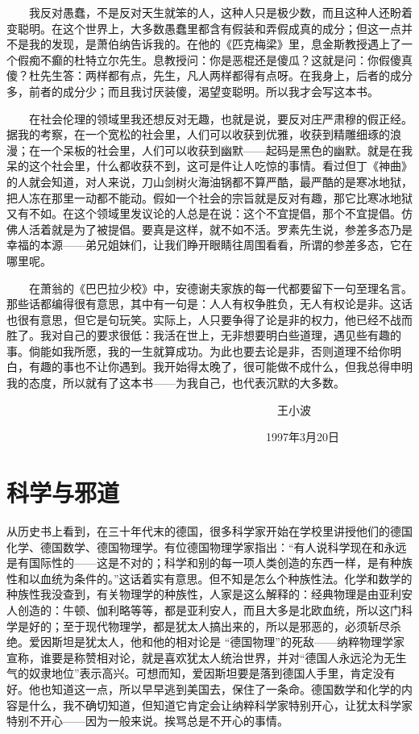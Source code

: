 　　我反对愚蠢，不是反对天生就笨的人，这种人只是极少数，而且这种人还盼着变聪明。在这个世界上，大多数愚蠢里都含有假装和弄假成真的成分；但这一点并不是我的发现，是萧伯纳告诉我的。在他的《匹克梅梁》里，息金斯教授遇上了一个假痴不癫的杜特立尔先生。息教授问：你是恶棍还是傻瓜？这就是问：你假傻真傻？杜先生答：两样都有点，先生，凡人两样都得有点呀。在我身上，后者的成分多，前者的成分少；而且我讨厌装傻，渴望变聪明。所以我才会写这本书。 

　　在社会伦理的领域里我还想反对无趣，也就是说，要反对庄严肃穆的假正经。据我的考察，在一个宽松的社会里，人们可以收获到优雅，收获到精雕细琢的浪漫；在一个呆板的社会里，人们可以收获到幽默——起码是黑色的幽默。就是在我呆的这个社会里，什么都收获不到，这可是件让人吃惊的事情。看过但丁《神曲》的人就会知道，对人来说，刀山剑树火海油锅都不算严酷，最严酷的是寒冰地狱，把人冻在那里一动都不能动。假如一个社会的宗旨就是反对有趣，那它比寒冰地狱又有不如。在这个领域里发议论的人总是在说：这个不宜提倡，那个不宜提倡。仿佛人活着就是为了被提倡。要真是这样，就不如不活。罗素先生说，参差多态乃是幸福的本源——弟兄姐妹们，让我们睁开眼睛往周围看看，所谓的参差多态，它在哪里呢。 

　　在萧翁的《巴巴拉少校》中，安德谢夫家族的每一代都要留下一句至理名言。那些话都编得很有意思，其中有一句是：人人有权争胜负，无人有权论是非。这话也很有意思，但它是句玩笑。实际上，人只要争得了论是非的权力，他已经不战而胜了。我对自己的要求很低：我活在世上，无非想要明白些道理，遇见些有趣的事。倘能如我所愿，我的一生就算成功。为此也要去论是非，否则道理不给你明白，有趣的事也不让你遇到。我开始得太晚了，很可能做不成什么，但我总得申明我的态度，所以就有了这本书——为我自己，也代表沉默的大多数。 


　　　　　　　　　　　　　　　　　　　　　　　　王小波 

　　　　　　　　　　　　　　　　　　　　　　　1997年3月20日

\chapter{科学与邪道}

从历史书上看到，在三十年代末的德国，很多科学家开始在学校里讲授他们的德国化学、德国数学、德国物理学。有位德国物理学家指出：“有人说科学现在和永远是有国际性的——这是不对的；科学和别的每一项人类创造的东西一样，是有种族性和以血统为条件的。”这话着实有意思。但不知是怎么个种族性法。化学和数学的种族性我没查到，有关物理学的种族性，人家是这么解释的：经典物理是由亚利安人创造的：牛顿、伽利略等等，都是亚利安人，而且大多是北欧血统，所以这门科学是好的；至于现代物理学，都是犹太人搞出来的，所以是邪恶的，必须斩尽杀绝。爱因斯坦是犹太人，他和他的相对论是 “德国物理”的死敌——纳粹物理学家宣称，谁要是称赞相对论，就是喜欢犹太人统治世界，并对“德国人永远沦为无生气的奴隶地位”表示高兴。可想而知，爱因斯坦要是落到德国人手里，肯定没有好。他也知道这一点，所以早早逃到美国去，保住了一条命。德国数学和化学的内容是什么，我不确切知道，但知道它肯定会让纳粹科学家特别开心，让犹太科学家特别不开心——因为一般来说。挨骂总是不开心的事情。 

